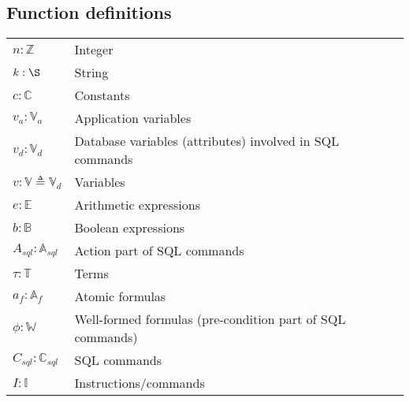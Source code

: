 \subsection{Function definitions} \label{subsec:function-definitions}

\begin{center}
    \begin{tabular}{l l}
        $n: \mathbb{Z}$                          & Integer                                                   \\
        $k: \S$                                  & String                                                    \\
        $c: \mathbb{C}$                          & Constants                                                 \\
        $v_a: \mathbb{V}_a$                      & Application variables                                     \\
        $v_d: \mathbb{V}_d$                      & Database variables (attributes) involved in SQL commands  \\
        $v: \mathbb{V} \triangleq \mathbb{V}_d $ & Variables                                                 \\
        $e: \mathbb{E}$                          & Arithmetic expressions                                    \\
        $b: \mathbb{B}$                          & Boolean expressions                                       \\
        $A_{sql}: \mathbb{A}_{sql}$              & Action part of SQL commands                               \\
        $\tau: \mathbb{T}$                       & Terms                                                     \\
        $a_f: \mathbb{A}_f$                      & Atomic formulas                                           \\
        $\phi : \mathbb{W}$                      & Well-formed formulas (pre-condition part of SQL commands) \\
        $C_{sql}: \mathbb{C}_{sql}$              & SQL commands                                              \\
        $I: \mathbb{I}$                          & Instructions/commands                                     \\
    \end{tabular}
\end{center}

